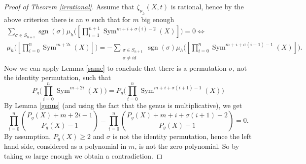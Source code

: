 \documentclass[11pt, a4paper, english, twoside]{article}
\theoremstyle{plain}
\theoremstyle{definition}
\DeclareMathOperator{\Sym}{Sym}
\DeclareMathOperator{\sgn}{sgn}
\begin{document}
\begin{proof}[Proof of Theorem \ref{irrational}]
    Assume that $\zeta_{\mu_h}(X,t)$ is rational, hence by the above criterion there is an $n$ such that for $m$ big enough
    \begin{gather*}
        \sum_{\sigma \in S_{n+1}} \sgn(\sigma) \mu_h \Big(\left[ \prod_{i=1}^{n+1} \Sym^{m + i + \sigma(i) - 2}(X)\right]\Big)  = 0 \Leftrightarrow \\ 
            \mu_h \Big ( \left[ \prod_{i=0}^n \Sym^{m + 2i}(X) \right] \Big )  = - \sum_{\substack{\sigma \in S_{n+1} \\ \sigma \neq id}} 
            \sgn(\sigma) \mu_h \Big ( \left[\prod_{i=0}^n \Sym^{m + i + \sigma(i+1) - 1}(X) \right]\Big ).
    \end{gather*}
    Now we can apply Lemma \ref{same} to conclude that there is a permutation $\sigma$, not the identity permutation, such that
    \[
        P_g \Big(\prod_{i=0}^n \Sym^{m+2i}(X)\Big) = P_g \Big( \prod_{i=0}^n \Sym^{m+i+\sigma(i+1) - 1}(X) \Big)
    \]
    By Lemma \ref{genus} (and using the fact that the genus is multiplicative), we get
    \[
        \prod_{i=0}^n \binom{P_g(X) + m + 2i - 1}{P_g(X) - 1} - \prod_{i=0}^n \binom{P_g(X) + m + i + \sigma(i+1) - 2}{P_g(X) - 1} = 0.
    \]
    By assumption, $P_g(X) \geq 2$ and $\sigma$ is not the identity permutation, hence the left hand side, considered as a polynomial in $m$, is not the zero polynomial. So by taking
    $m$ large enough we obtain a contradiction.
\end{proof}

{}

\end{document}
